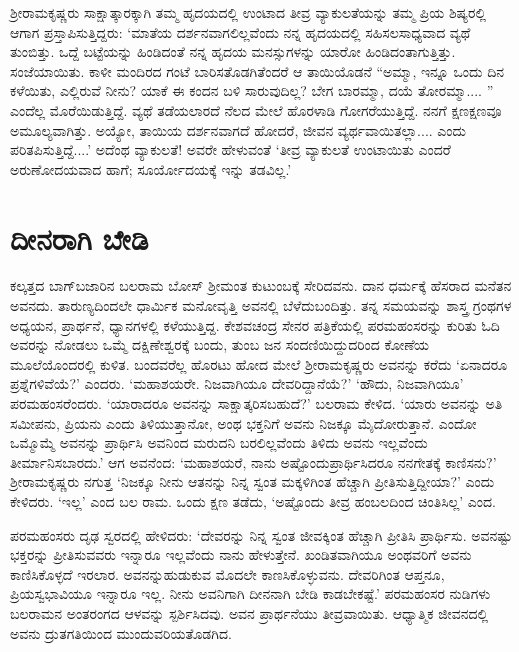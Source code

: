 ಶ‍್ರೀರಾಮಕೃಷ್ಣರು ಸಾಕ್ಷಾತ್ಕಾರಕ್ಕಾಗಿ ತಮ್ಮ ಹೃದಯದಲ್ಲಿ ಉಂಟಾದ ತೀವ್ರ ವ್ಯಾಕುಲತೆಯನ್ನು ತಮ್ಮ ಪ್ರಿಯ ಶಿಷ್ಯರಲ್ಲಿ ಆಗಾಗ ಪ್ರಸ್ತಾಪಿಸುತ್ತಿದ್ದರು: ‘ಮಾತೆಯ ದರ್ಶನವಾಗಲಿಲ್ಲವೆಂದು ನನ್ನ ಹೃದಯದಲ್ಲಿ ಸಹಿಸಲಸಾಧ್ಯವಾದ ವ್ಯಥೆ ತುಂಬಿತ್ತು. ಒದ್ದೆ ಬಟ್ಟೆಯನ್ನು ಹಿಂಡಿದಂತೆ ನನ್ನ ಹೃದಯ ಮನಸ್ಸುಗಳನ್ನು ಯಾರೋ ಹಿಂಡಿದಂತಾಗುತ್ತಿತ್ತು. ಸಂಜೆಯಾಯಿತು. ಕಾಳೀ ಮಂದಿರದ ಗಂಟೆ ಬಾರಿಸತೊಡಗಿತೆಂದರೆ ಆ ತಾಯಿಯೊಡನೆ “ಅಮ್ಮಾ, ಇನ್ನೂ ಒಂದು ದಿನ ಕಳೆಯಿತು, ಎಲ್ಲಿರುವೆ ನೀನು? ಯಾಕೆ ಈ ಕಂದನ ಬಳಿ ಸಾರುವುದಿಲ್ಲ? ಬೇಗ ಬಾರಮ್ಮಾ, ದಯೆ ತೋರಮ್ಮಾ.... ” ಎಂದೆಲ್ಲ ಮೊರೆಯಿಡುತ್ತಿದ್ದೆ. ವ್ಯಥೆ ತಡೆಯಲಾರದೆ ನೆಲದ ಮೇಲೆ ಹೊರಳಾಡಿ ಗೋಗರೆಯುತ್ತಿದ್ದೆ. ನನಗೆ ಕ್ಷಣಕ್ಷಣವೂ ಅಮೂಲ್ಯವಾಗಿತ್ತು. ಅಯ್ಯೋ, ತಾಯಿಯ ದರ್ಶನವಾಗದೆ ಹೋದರೆ, ಜೀವನ ವ್ಯರ್ಥವಾಯಿತಲ್ಲಾ.... ಎಂದು ಪರಿತಪಿಸುತ್ತಿದ್ದೆ....’ ಅದೆಂಥ ವ್ಯಾಕುಲತೆ! ಅವರೇ ಹೇಳುವಂತೆ ‘ತೀವ್ರ ವ್ಯಾಕುಲತೆ ಉಂಟಾಯಿತು ಎಂದರೆ ಅರುಣೋದಯವಾದ ಹಾಗೆ; ಸೂರ್ಯೋದಯಕ್ಕೆ ಇನ್ನು ತಡವಿಲ್ಲ.’


\section*{ದೀನರಾಗಿ ಬೇಡಿ}


ಕಲ್ಕತ್ತದ ಬಾಗ್​ಬಜಾರಿನ ಬಲರಾಮ ಬೋಸ್ ಶ‍್ರೀಮಂತ ಕುಟುಂಬಕ್ಕೆ ಸೇರಿದವನು. ದಾನ ಧರ್ಮಕ್ಕೆ ಹೆಸರಾದ ಮನೆತನ ಅವನದು. ತಾರುಣ್ಯದಿಂದಲೇ ಧಾರ್ಮಿಕ ಮನೋವೃತ್ತಿ ಅವನಲ್ಲಿ ಬೆಳೆದುಬಂದಿತ್ತು. ತನ್ನ ಸಮಯವನ್ನು ಶಾಸ್ತ್ರ ಗ್ರಂಥಗಳ ಅಧ್ಯಯನ, ಪ್ರಾರ್ಥನೆ, ಧ್ಯಾನಗಳಲ್ಲಿ ಕಳೆಯುತ್ತಿದ್ದ. ಕೇಶವಚಂದ್ರ ಸೇನರ ಪತ್ರಿಕೆಯಲ್ಲಿ ಪರಮಹಂಸರನ್ನು ಕುರಿತು ಓದಿ ಅವರನ್ನು ನೋಡಲು ಒಮ್ಮೆ ದಕ್ಷಿಣೇಶ್ವರಕ್ಕೆ ಬಂದು, ತುಂಬ ಜನ ಸಂದಣಿಯಿದ್ದುದರಿಂದ ಕೋಣೆಯ ಮೂಲೆಯೊಂದರಲ್ಲಿ ಕುಳಿತ. ಬಂದವರೆಲ್ಲ ಹೊರಟು ಹೋದ ಮೇಲೆ ಶ‍್ರೀರಾಮಕೃಷ್ಣರು ಅವನನ್ನು ಕರೆದು ‘ಏನಾದರೂ ಪ್ರಶ್ನೆಗಳಿವೆಯೆ?’ ಎಂದರು. ‘ಮಹಾಶಯರೇ. ನಿಜವಾಗಿಯೂ ದೇವರಿದ್ದಾನೆಯೆ?’ ‘ಹೌದು, ನಿಜವಾಗಿಯೂ’ ಪರಮಹಂಸರೆಂದರು. ‘ಯಾರಾದರೂ ಅವನನ್ನು ಸಾಕ್ಷಾತ್ಕರಿಸಬಹುದೆ?’ ಬಲರಾಮ ಕೇಳಿದ. ‘ಯಾರು ಅವನನ್ನು ಅತಿ ಸಮೀಪನು, ಪ್ರಿಯನು ಎಂದು ತಿಳಿಯುತ್ತಾನೋ, ಅಂಥ ಭಕ್ತನಿಗೆ ಅವನು ನಿಜಕ್ಕೂ ಮೈದೋರುತ್ತಾನೆ. ಎಂದೋ ಒಮ್ಮೊಮ್ಮೆ ಅವನನ್ನು ಪ್ರಾರ್ಥಿಸಿ ಅವನಿಂದ ಮರುದನಿ ಬರಲಿಲ್ಲವೆಂದು ತಿಳಿದು ಅವನು ಇಲ್ಲವೆಂದು ತೀರ್ಮಾನಿಸಬಾರದು.’ ಆಗ ಅವನೆಂದ: ‘ಮಹಾಶಯರೆ, ನಾನು ಅಷ್ಟೊಂದು\break ಪ್ರಾರ್ಥಿಸಿದರೂ ನನಗೇತಕ್ಕೆ ಕಾಣಿಸನು?’ ಶ‍್ರೀರಾಮಕೃಷ್ಣರು ನಗುತ್ತ ‘ನಿಜಕ್ಕೂ ನೀನು ಆತನನ್ನು ನಿನ್ನ ಸ್ವಂತ ಮಕ್ಕಳಿಗಿಂತ ಹೆಚ್ಚಾಗಿ ಪ್ರೀತಿಸುತ್ತಿದ್ದೀಯಾ?’ ಎಂದು ಕೇಳಿದರು. ‘ಇಲ್ಲ’ ಎಂದ ಬಲ ರಾಮ. ಒಂದು ಕ್ಷಣ ತಡೆದು, ‘ಅಷ್ಟೊಂದು ತೀವ್ರ ಹಂಬಲದಿಂದ ಚಿಂತಿಸಿಲ್ಲ’ ಎಂದ.

ಪರಮಹಂಸರು ದೃಢ ಸ್ವರದಲ್ಲಿ ಹೇಳಿದರು: ‘ದೇವರನ್ನು ನಿನ್ನ ಸ್ವಂತ ಜೀವಕ್ಕಿಂತ ಹೆಚ್ಚಾಗಿ ಪ್ರೀತಿಸಿ ಪ್ರಾರ್ಥಿಸು. ಅವನಷ್ಟು ಭಕ್ತರನ್ನು ಪ್ರೀತಿಸುವವರು ಇನ್ನಾರೂ ಇಲ್ಲವೆಂದು ನಾನು ಹೇಳುತ್ತೇನೆ. ಖಂಡಿತವಾಗಿಯೂ ಅಂಥವರಿಗೆ ಅವನು ಕಾಣಿಸಿಕೊಳ್ಳದೆ ಇರಲಾರ. \hbox\bgroup ಅವನನ್ನು\egroup\break ಹುಡುಕುವ ಮೊದಲೇ ಕಾಣಸಿಕೊಳ್ಳುವನು. ದೇವರಿಗಿಂತ ಆಪ್ತನೂ, ಪ್ರಿಯಸ್ವಭಾವಿಯೂ ಇನ್ನಾರೂ ಇಲ್ಲ. ನೀನು ಅವನಿಗಾಗಿ ದೀನನಾಗಿ ಬೇಡಿ ಕಾಡಬೇಕಷ್ಟೆ.’ ಪರಮಹಂಸರ ನುಡಿಗಳು ಬಲರಾಮನ ಅಂತರಂಗದ ಆಳವನ್ನು ಸ್ಪರ್ಶಿಸಿದವು. ಅವನ ಪ್ರಾರ್ಥನೆಯು ತೀವ್ರವಾಯಿತು. ಆಧ್ಯಾತ್ಮಿಕ ಜೀವನದಲ್ಲಿ ಅವನು ದ್ರುತಗತಿಯಿಂದ ಮುಂದುವರಿಯತೊಡಗಿದ.

